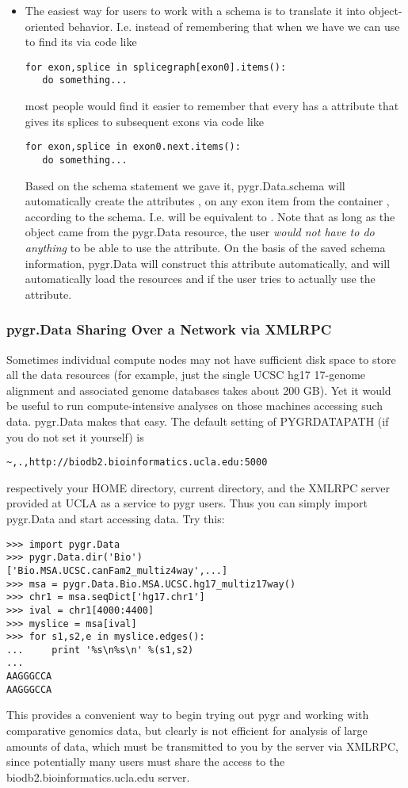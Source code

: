 \documentclass{howto}
\begin{document}
\begin{itemize}
\item The easiest way for users to work with a schema is to translate
it into object-oriented behavior.  I.e. instead of remembering that
when we have  we can use  to find its
 via code like 
\begin{verbatim}
for exon,splice in splicegraph[exon0].items():
   do something...
\end{verbatim}
most people would find it easier to remember that every 
has a  attribute that gives its splices to subsequent exons
via code like
\begin{verbatim}
for exon,splice in exon0.next.items():
   do something...
\end{verbatim}
Based on the schema statement we gave it,
pygr.Data.schema will automatically create the attributes ,
 on any exon item from the container ,
according to the schema.  I.e.  will be equivalent to
.  Note that as long as the object 
came from the pygr.Data resource, the user {\em would not have to do anything}
to be able to use the  attribute.  On the basis of the saved
schema information, pygr.Data will construct this attribute automatically,
and will automatically load the resources  and 
if the user tries to actually use the  attribute.
\end{itemize}

\subsubsection{pygr.Data Sharing Over a Network via XMLRPC}
Sometimes individual compute nodes may not have sufficient disk space to
store all the data resources (for example, just the single UCSC hg17 17-genome alignment and 
associated genome databases takes about 200 GB).  Yet it would be useful
to run compute-intensive analyses on those machines accessing such data.
pygr.Data makes that easy.  The default setting of PYGRDATAPATH (if you
do not set it yourself) is 
\begin{verbatim}~,.,http://biodb2.bioinformatics.ucla.edu:5000\end{verbatim}
respectively your HOME directory, current directory, and the XMLRPC
server provided at UCLA as a service to pygr users.  Thus you can
simply import pygr.Data and start accessing data.  Try this:
\begin{verbatim}
>>> import pygr.Data
>>> pygr.Data.dir('Bio')
['Bio.MSA.UCSC.canFam2_multiz4way',...]
>>> msa = pygr.Data.Bio.MSA.UCSC.hg17_multiz17way()
>>> chr1 = msa.seqDict['hg17.chr1']
>>> ival = chr1[4000:4400]
>>> myslice = msa[ival]
>>> for s1,s2,e in myslice.edges():
...     print '%s\n%s\n' %(s1,s2)
...
AAGGGCCA
AAGGGCCA
\end{verbatim}
This provides a convenient way to begin trying out pygr and working
with comparative genomics data, but clearly is not efficient for analysis
of large amounts of data, which must be transmitted to you by the server
via XMLRPC, since potentially many users must share the access to the 
biodb2.bioinformatics.ucla.edu server.
\end{document}
